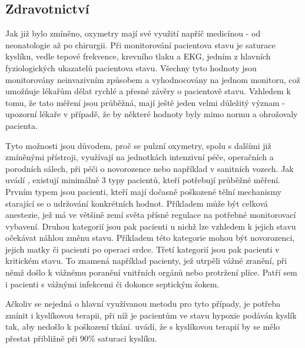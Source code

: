 \subsection {Zdravotnictví}
Jak již bylo zmíněno, oxymetry mají své využití napříč medicínou - od neonatologie až po chirurgii. Při monitorování pacientova stavu je saturace kyslíku, vedle tepové frekvence, krevního tlaku a EKG, jedním z hlavních fyziologických ukazatelů pacientova stavu. Všechny tyto hodnoty jsou monitorovány neinvazivním způsobem a vyhodnocovány na jednom monitoru, což umožňuje lékařům  dělat rychlé a přesné závěry o pacientově stavu. Vzhledem k tomu, že tato měření jsou průběžná, mají ještě jeden velmi důležitý význam - upozorní lékaře v případě, že by některé hodnoty byly mimo normu a ohrožovaly pacienta.
\par Tyto možnosti jsou důvodem, proč se pulzní oxymetry, spolu s dalšími již zmíněnými přístroji, využívají na jednotkách intenzivní péče, operačních a porodních sálech, při péči o novorozence nebo například v sanitních vozech. Jak uvádí \cite{monitoring}, existují minimálně 3 typy pacientů, kteří potřebují průběžné měření. Prvním typem jsou pacienti, kteří mají dočasně poškozené tělní mechanismy starající se o udržování konkrétních hodnot. Příkladem může být celková anestezie, jež má ve většině zemí světa přísné regulace na potřebné monitorovací vybavení. Druhou kategorií jsou pak pacienti u nichž lze vzhledem k jejich stavu očekávat náhlou změnu stavu. Příkladem této kategorie mohou být novorozenci, jejich matky či pacienti po operaci srdce. Třetí kategorií jsou pak pacienti v kritickém stavu. To znamená například pacienty, jež utrpěli vážné zranění, při němž došlo k vážnému poranění vnitřních orgánů nebo protržení plíce. Patří sem i pacienti s vážnými infekcemi či dokonce septickým šokem.
\par Ačkoliv se nejedná o hlavní využívanou metodu pro tyto případy, je potřeba zmínit i kyslíkovou terapii, při níž je pacientům ve stavu hypoxie podáván kyslík tak, aby nedošlo k poškození tkání. \cite{O2terapie} uvádí, že s kyslíkovou terapií by se mělo přestat přibližně při 90\% saturaci kyslíku.